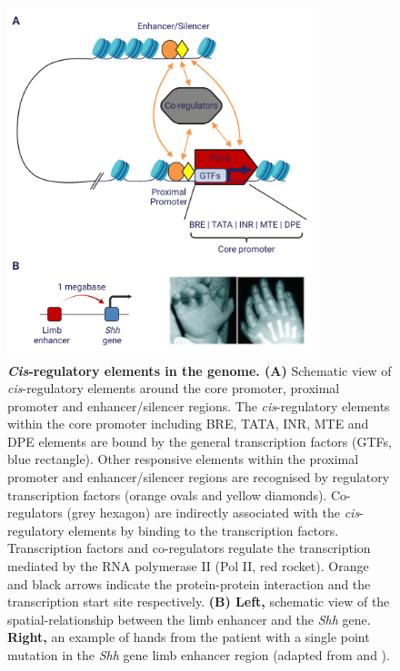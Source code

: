 \begin{figure}[!ht]
    \centering
    \includegraphics[width=0.8\textwidth]{chapter1/figures/fig1.pdf}
    \caption[\textit{Cis}-regulatory elements in the genome]{\textbf{\textit{Cis}-regulatory elements in the genome. (A)} Schematic view of \textit{cis}-regulatory elements around the core promoter, proximal promoter and enhancer/silencer regions. The \textit{cis}-regulatory elements within the core promoter including BRE, TATA, INR, MTE and DPE elements are bound by the general transcription factors (GTFs, blue rectangle). Other responsive elements within the proximal promoter and enhancer/silencer regions are recognised by regulatory transcription factors (orange ovals and yellow diamonds). Co-regulators (grey hexagon) are indirectly associated with the \textit{cis}-regulatory elements by binding to the transcription factors. Transcription factors and co-regulators regulate the transcription mediated by the RNA polymerase II (Pol II, red rocket). Orange and black arrows indicate the protein-protein interaction and the transcription start site respectively. \textbf{(B) Left,} schematic view of the spatial-relationship between the limb enhancer and the \textit{Shh} gene. \textbf{Right,} an example of hands from the patient with a single point mutation in the \textit{Shh} gene limb enhancer region (adapted from \cite{fuda2009defining} and \cite{visel2009genomic}).}
    \label{fig:fig1}
\end{figure}

